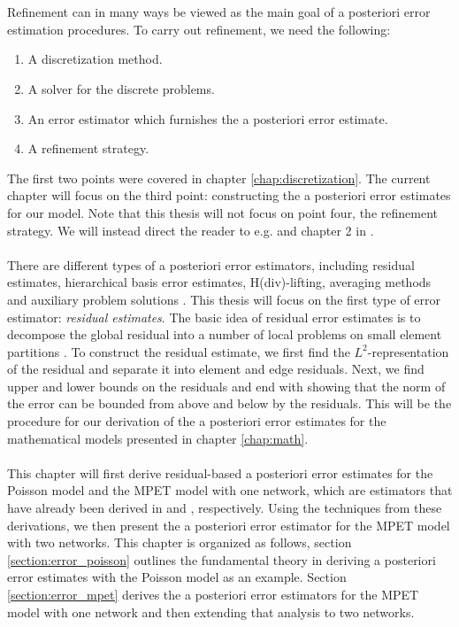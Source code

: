 \\
\\
Refinement can in many ways be viewed as the main goal of a posteriori error estimation procedures. To carry out refinement, we need the following:
\begin{enumerate}[noitemsep]
\item A discretization method.
\item A solver for the discrete problems.
\item An error estimator which furnishes the a posteriori error estimate. 
\item A refinement strategy.
\end{enumerate}
The first two points were covered in chapter \ref{chap:discretization}. The current chapter will focus on the third point: constructing the a posteriori error estimates for our model. Note that this thesis will not focus on point four, the refinement strategy. We will instead direct the reader to e.g. \cite{mitchell, eriksson} and chapter 2 in \cite{verfurth13}. 
\\
\\
There are different types of a posteriori error estimators, including residual estimates, hierarchical basis error estimates, H(div)-lifting, averaging methods and auxiliary problem solutions \cite{verfurth13}. This thesis will focus on the first type of error estimator: \textit{residual estimates}. The basic idea of residual error estimates is to decompose the global residual into a number of local problems on small element partitions \cite{babuska78a}. To construct the residual estimate, we first find the $L^2$-representation of the residual and separate it into element and edge residuals. Next, we find upper and lower bounds on the residuals and end with showing that the norm of the error can be bounded from above and below by the residuals. This will be the procedure for our derivation of the a posteriori error estimates for the mathematical models presented in chapter \ref{chap:math}. 
\\
\\
This chapter will first derive residual-based a posteriori error estimates for the Poisson model and the MPET model with one network, which are estimators that have already been derived in \cite{verfurth96} and \cite{meunier}, respectively. Using the techniques from these derivations, we then present the a posteriori error estimator for the MPET model with two networks. This chapter is organized as follows, section \ref{section:error_poisson} outlines the fundamental theory in deriving a posteriori error estimates with the Poisson model as an example. Section \ref{section:error_mpet} derives the a posteriori error estimators for the MPET model with one network and then extending that analysis to two networks. 

